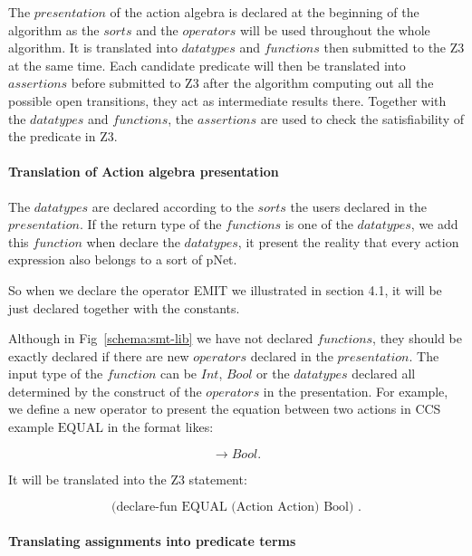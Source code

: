 \documentclass{lncs/llncs}
\newcommand{\QIN}[1]{\textcolor{airforceblue}{#1}}
\begin{document}
The $presentation$ of the action algebra
is declared at the beginning of the algorithm as the $sorts$ and the
$operators$ will be used throughout the whole algorithm. It is
translated into $datatypes$ and $functions$ then submitted to the Z3
at the same time. Each candidate predicate will then be translated into $assertions$ before submitted to Z3 after the algorithm computing out all the possible open transitions, they act as intermediate results there. Together with the $datatypes$ and $functions$, the $assertions$ are used to check the satisfiability of the predicate in Z3.


\paragraph{Translation of Action algebra presentation}

The $datatypes$ are declared according to the $sorts$ the users declared in the $presentation$. If the return type of the $functions$ is one of the $datatypes$, we add this $function$ when declare the $datatypes$, it present the reality that every action expression also belongs to a sort of pNet. 

\QIN{
So when we declare the operator EMIT we illustrated in section 4.1, it will be just declared together with the constants.
}

 Although in Fig~\ref{schema:smt-lib} we have not declared $functions$, they should be exactly declared if there are new $operators$ declared in the $presentation$. The input type of the $function$ can be $Int$, $Bool$ or the $datatypes$ declared all determined by the construct of the  $operators$ in the presentation. For example, we define a new operator to present the equation between two actions in CCS example $\text{EQUAL}$ in the format likes:

\[< Action , Action > \rightarrow Bool .\]

It will be translated into the Z3 statement: 

\[\text{(declare-fun\ EQUAL\ (Action\ Action)\ Bool) .}\]

\paragraph{Translating assignments into predicate terms}
\end{document}
